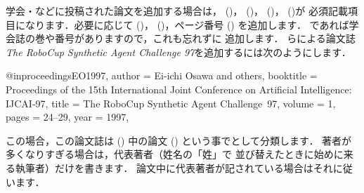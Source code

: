 %
学会・などに投稿された論文を追加する場合は，
 ()， ()，
 ()， ()が
必須記載項目になります．必要に応じて ()，
 ()，ページ番号 () を追加します．
であれば学会誌の巻や番号がありますので，これも忘れずに
追加します．
らによる論文誌\emph{The RoboCup Synthetic Agent Challenge
 97}を追加するには次のようにします．

\begin{intext}
@inproceedings{EO1997,
  author    = {Ei-ichi Osawa and others}, 
  booktitle = {Proceedings of the 15th International Joint Conference
               on Artificial Intelligence: IJCAI-97}, 
  title     = {The RoboCup Synthetic Agent Challenge~97},
  volume    = 1,
  pages     = {24--29},
  year      = 1997, 
}   
\end{intext}


この場合，この論文誌は () 中の論文 () 
という事でとして分類します．
著者が多くなりすぎる場合は，代表著者（姓名の「姓」で
並び替えたときに始めに来る執筆者）だけを書きます．
論文中に代表著者が記されている場合はそれに従います．



